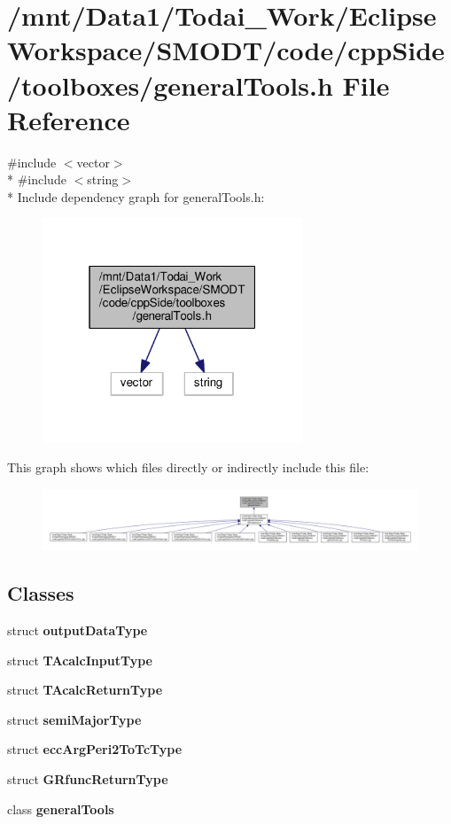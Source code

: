 \section{/mnt/\-Data1/\-Todai\-\_\-\-Work/\-Eclipse\-Workspace/\-S\-M\-O\-D\-T/code/cpp\-Side/toolboxes/general\-Tools.h File Reference}
\label{general_tools_8h}
{\ttfamily \#include $<$vector$>$}\\*
{\ttfamily \#include $<$string$>$}\\*
Include dependency graph for general\-Tools.\-h\-:
\nopagebreak
\begin{figure}[H]
\begin{center}
\leavevmode
\includegraphics[width=220pt]{general_tools_8h__incl}
\end{center}
\end{figure}
This graph shows which files directly or indirectly include this file\-:
\nopagebreak
\begin{figure}[H]
\begin{center}
\leavevmode
\includegraphics[width=350pt]{general_tools_8h__dep__incl}
\end{center}
\end{figure}
\subsection*{Classes}
\begin{DoxyCompactItemize}
\item 
struct {\bf output\-Data\-Type}
\item 
struct {\bf T\-Acalc\-Input\-Type}
\item 
struct {\bf T\-Acalc\-Return\-Type}
\item 
struct {\bf semi\-Major\-Type}
\item 
struct {\bf ecc\-Arg\-Peri2\-To\-Tc\-Type}
\item 
struct {\bf G\-Rfunc\-Return\-Type}
\item 
class {\bf general\-Tools}
\end{DoxyCompactItemize}
